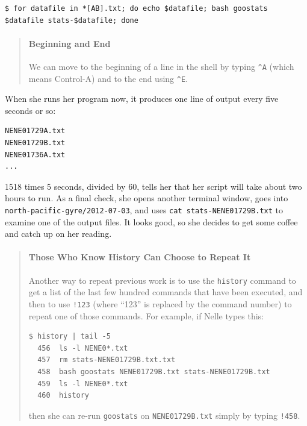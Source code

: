 \documentclass{book}
\begin{document}
\begin{verbatim}
$ for datafile in *[AB].txt; do echo $datafile; bash goostats $datafile stats-$datafile; done
\end{verbatim}

\begin{quote}
\mbox{}\paragraph{Beginning and End}

We can move to the beginning of a line in the shell by typing
\texttt{\^{}A} (which means Control-A) and to the end using
\texttt{\^{}E}.
\end{quote}

When she runs her program now, it produces one line of output every five
seconds or so:

\begin{verbatim}
NENE01729A.txt
NENE01729B.txt
NENE01736A.txt
...
\end{verbatim}

1518 times 5 seconds, divided by 60, tells her that her script will take
about two hours to run. As a final check, she opens another terminal
window, goes into \texttt{north-pacific-gyre/2012-07-03}, and uses
\texttt{cat stats-NENE01729B.txt} to examine one of the output files. It
looks good, so she decides to get some coffee and catch up on her
reading.

\begin{quote}
\mbox{}\paragraph{Those Who Know History Can Choose to Repeat It}

Another way to repeat previous work is to use the \texttt{history}
command to get a list of the last few hundred commands that have been
executed, and then to use \texttt{!123} (where ``123'' is replaced by
the command number) to repeat one of those commands. For example, if
Nelle types this:

\begin{verbatim}
$ history | tail -5
  456  ls -l NENE0*.txt
  457  rm stats-NENE01729B.txt.txt
  458  bash goostats NENE01729B.txt stats-NENE01729B.txt
  459  ls -l NENE0*.txt
  460  history
\end{verbatim}

then she can re-run \texttt{goostats} on \texttt{NENE01729B.txt} simply
by typing \texttt{!458}.
\end{quote}
\end{document}
